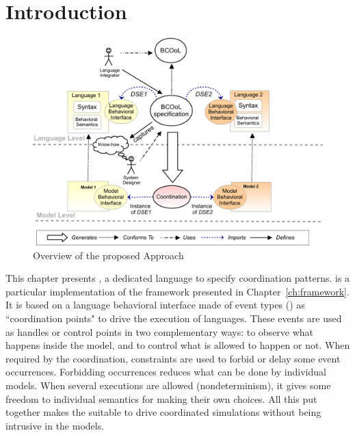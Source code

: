 \section{Introduction}
\label{sec:bcoolintro}

\begin{figure}
	\begin{center}
		\includegraphics[width=.8\textwidth]{framework/figs/bcool}
		\caption{Overview of the proposed Approach}
		\label{fig:bcoolapp}
	\end{center}
\end{figure}

This chapter presents \bcool, a dedicated language to specify coordination patterns. \bcool is a particular implementation of the framework presented in Chapter~\ref{ch:framework}. It is based on a language behavioral interface made of event types (\ie \dse\cite{sle13-combemale}) as ``coordination points" to drive the execution of languages. These events are used as handles or control points in two complementary ways: to observe what happens inside the model, and to control what is allowed to happen or not. When required by the coordination, constraints are used to forbid or delay some event occurrences. Forbidding occurrences reduces what can be done by individual models. When several executions are allowed
(nondeterminism), it gives some freedom to individual semantics for making their own choices. All this put together makes the \dse suitable to drive coordinated simulations without being intrusive in the models. 

